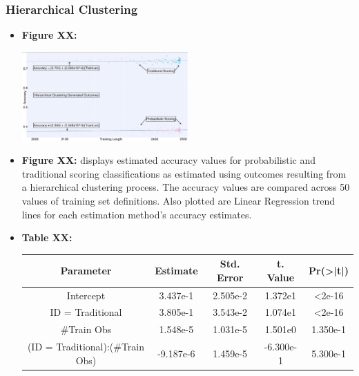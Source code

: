 \documentclass[12pt,]{article}
\begin{document}
\hypertarget{hierarchical-clustering}{%
\subsubsection{Hierarchical Clustering}\label{hierarchical-clustering}}

\begin{itemize}
\item
  \textbf{Figure XX:}

  \begin{center}
  \includegraphics[width=0.5\textwidth]{HCResultsGraph.jpeg}
  \end{center}
\item
  \textbf{Figure XX:} displays estimated accuracy values for
  probabilistic and traditional scoring classifications as estimated
  using outcomes resulting from a hierarchical clustering process. The
  accuracy values are compared across 50 values of training set
  definitions. Also plotted are Linear Regression trend lines for each
  estimation method's accuracy estimates.
\item
  \textbf{Table XX:}

  \begin{center}
  \begin{tabular}{|c|c|c|c|c|}
  \hline
  Parameter                      & Estimate  & Std. Error & t. Value  & Pr(>|t|) \\
  \hline
  \hline
  Intercept                      &  3.437e-1 &  2.505e-2  &  1.372e1  & <2e-16   \\
  \hline
  ID = Traditional               & 3.805e-1 &  3.543e-2  & 1.074e1  & <2e-16 \\
  \hline
  \#Train Obs                    &  1.548e-5 &  1.031e-5  &  1.501e0  & 1.350e-1 \\
  \hline
  (ID = Traditional):(\#Train Obs) &  -9.187e-6 &  1.459e-5  &  -6.300e-1 & 5.300e-1 \\
  \hline
  \end{tabular}
  \end{center}


\end{itemize}
\end{document}
